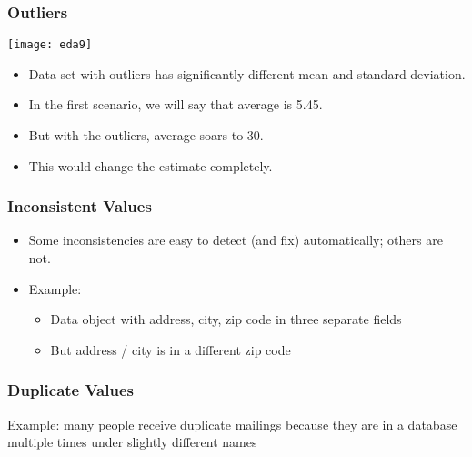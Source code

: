 \begin{frame}[fragile] \frametitle{Outliers}
\begin{center}
\texttt{[image: eda9]}
\end{center}

\begin{itemize}
\item Data set with outliers has significantly different mean and standard deviation. 
\item In the first scenario, we will say that average is 5.45. 
\item But with the outliers, average soars to 30. 
\item This would change the estimate completely. 
\end{itemize}
\end{frame}



\begin{frame}[fragile] \frametitle{Inconsistent Values}
\begin{itemize}
\item Some inconsistencies are easy to detect (and fix) automatically; others are not.
\item Example:
	\begin{itemize}
	\item Data object with address, city, zip code in three separate fields
	\item But address / city is in a different zip code
	\end{itemize}
\end{itemize}
\end{frame}


\begin{frame}[fragile] \frametitle{Duplicate Values}
Example: many people receive duplicate mailings because they are in a database multiple times under slightly different names

\end{frame}


